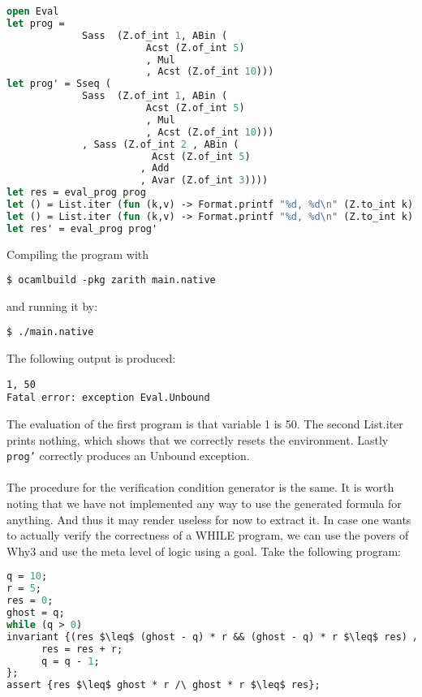 \begin{lstlisting}[caption={ocaml program using the evaluator},label={lst:ocamlexample},language=sml]
open Eval
let prog =
             Sass  (Z.of_int 1, ABin (
                        Acst (Z.of_int 5)
                        , Mul
                        , Acst (Z.of_int 10)))
let prog' = Sseq (
             Sass  (Z.of_int 1, ABin (
                        Acst (Z.of_int 5)
                        , Mul
                        , Acst (Z.of_int 10)))
             , Sass (Z.of_int 2 , ABin (
                         Acst (Z.of_int 5)
                       , Add
                       , Avar (Z.of_int 3))))
let res = eval_prog prog
let () = List.iter (fun (k,v) -> Format.printf "%d, %d\n" (Z.to_int k) (Z.to_int v)) res
let () = List.iter (fun (k,v) -> Format.printf "%d, %d\n" (Z.to_int k) (Z.to_int v)) sigma.lst
let res' = eval_prog prog'
\end{lstlisting}

Compiling the program with

\begin{lstlisting}
$ ocamlbuild -pkg zarith main.native
\end{lstlisting}

and running it by:

\begin{lstlisting}
$ ./main.native
\end{lstlisting}

The following output is produced:

\begin{lstlisting}
1, 50
Fatal error: exception Eval.Unbound
\end{lstlisting}

The evaluation of the first program is that variable 1 is 50. The second List.iter prints nothing,
which shows that we correctly resets the environment. Lastly \texttt{prog'} correctly produces an Unbound exception.
\\~\\
The procedure for the verification condition generator is the same.
It is worth noting that we have not implemented any way to use the generated formula for anything.
And thus it may render useless for now to extract it.
In case one wants to actually verify the correctness of a WHILE program, we can use the povers of Why3 and use the meta level of logic using a goal.
Take the following program:

\begin{lstlisting}[caption={WHILE program which multiples q and r by repeated addition},label={lst:whileexample},language=sml]
q = 10;
r = 5;
res = 0;
ghost = q;
while (q > 0)
invariant {(res $\leq$ (ghost - q) * r && (ghost - q) * r $\leq$ res) /\ 0 \leq q} {
      res = res + r;
      q = q - 1;
};
assert {res $\leq$ ghost * r /\ ghost * r $\leq$ res};
\end{lstlisting}

